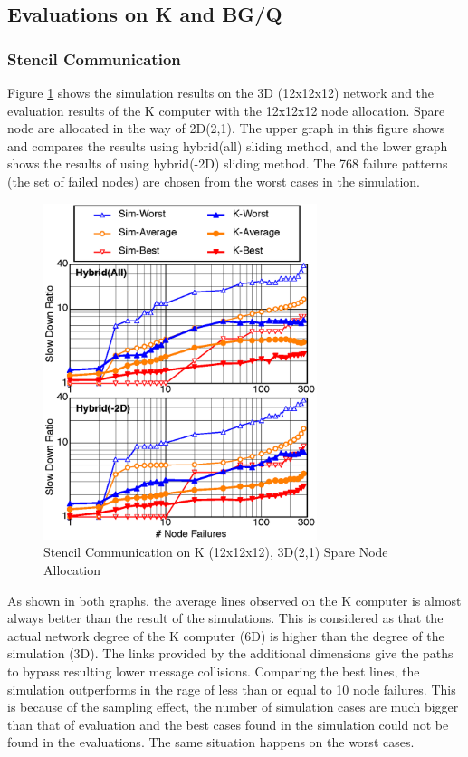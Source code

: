 \documentclass[Afour,times,sagev]{sagej}
\begin{document}
\subsection{Evaluations on K and BG/Q}

\subsubsection{Stencil Communication}

Figure \ref{fig:k-stencil} shows the simulation results on the
3D (12x12x12) network and the evaluation results of the K computer with
the 12x12x12 node allocation. Spare node are allocated in the way of
2D(2,1). The upper graph in this figure shows and compares the
results using hybrid(all) sliding method, and the lower graph shows
the results of using hybrid(-2D) sliding method. The 768 failure
patterns (the set of failed nodes) are chosen from the worst cases in
the simulation.

\begin{figure}[ht]
\centering
\includegraphics[width=80mm]{Figs/K-Stencil-CL.eps}
  \caption{Stencil Communication on K (12x12x12), 3D(2,1) Spare Node
    Allocation}
  \label{fig:k-stencil}
\end{figure}

As shown in both graphs, the average lines observed on the K computer
is almost always better than the result of the simulations. This is
considered as that the actual network degree of the K computer (6D) is
higher than the degree of the simulation (3D). The links provided by
the additional dimensions give the paths to bypass resulting lower
message collisions. Comparing the best lines, the simulation
outperforms in the rage of less than or equal to 10 node
failures. This is because of the sampling effect, the number of
simulation cases are much bigger than that of evaluation and the best
cases found in the simulation could not be found in the
evaluations. The same situation happens on the worst cases.
\end{document}
